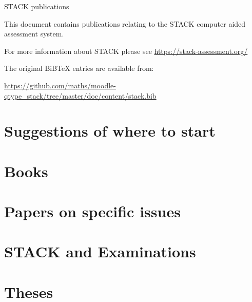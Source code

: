 \documentclass[11pt]{article}
\begin{document}
\centerline{\Large STACK publications}
$~$\\[1cm]

This document contains publications relating to the STACK computer aided assessment system.

For more information about STACK please see \href{https://stack-assessment.org/}{https://stack-assessment.org/}

The original BiBTeX entries are available from:

\begin{center}
\url{https://github.com/maths/moodle-qtype_stack/tree/master/doc/content/stack.bib}
\end{center}


\section{Suggestions of where to start}
\nocite{2023-Proof-Assessment,2017MCQ,2013CAA,2022-STACK-Edinburgh,2024-ResearchAgenda}
\printbibliography[heading=none]

\section{Books}
\nocite{2013CAA,Nakamura2010}
\printbibliography[heading=none]

\section{Papers on specific issues}
\nocite{SangwinRamsden2006,Nakamura2016b,2017STACKUnits,2018Sangwin-equivalence-proof,Sangwin2015Inequalities}
\printbibliography[heading=none]

\section{STACK and Examinations}
\nocite{Sangwin2019CERME,2016AutomationExaminations,Sangwin2019CERME,Sangwin2018CMEEI}
\printbibliography[heading=none]

\section{Theses}
\nocite{Badger2013,Majander2011,Majander2010,Ruokokoski2009,Harjula2008,CervalPena2008,Tanskanen2017}
\printbibliography[heading=none]
\end{document}
